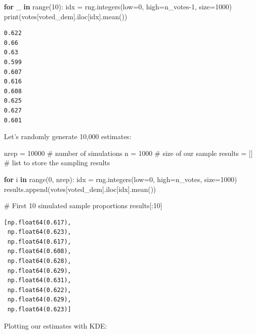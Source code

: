 \documentclass[
  letterpaper,
  DIV=11,
  numbers=noendperiod]{scrreprt}
\newenvironment{Shaded}{\begin{snugshade}}{\end{snugshade}}
\newcommand{\BuiltInTok}[1]{\textcolor[rgb]{0.00,0.23,0.31}{#1}}
\newcommand{\CommentTok}[1]{\textcolor[rgb]{0.37,0.37,0.37}{#1}}
\newcommand{\ControlFlowTok}[1]{\textcolor[rgb]{0.00,0.23,0.31}{\textbf{#1}}}
\newcommand{\DecValTok}[1]{\textcolor[rgb]{0.68,0.00,0.00}{#1}}
\newcommand{\KeywordTok}[1]{\textcolor[rgb]{0.00,0.23,0.31}{\textbf{#1}}}
\newcommand{\NormalTok}[1]{\textcolor[rgb]{0.00,0.23,0.31}{#1}}
\newcommand{\OperatorTok}[1]{\textcolor[rgb]{0.37,0.37,0.37}{#1}}
\newcommand{\StringTok}[1]{\textcolor[rgb]{0.13,0.47,0.30}{#1}}
\begin{document}
\begin{Shaded}
\begin{Highlighting}[]
\ControlFlowTok{for}\NormalTok{ \_ }\KeywordTok{in} \BuiltInTok{range}\NormalTok{(}\DecValTok{10}\NormalTok{):}
\NormalTok{  idx }\OperatorTok{=}\NormalTok{ rng.integers(low}\OperatorTok{=}\DecValTok{0}\NormalTok{, high}\OperatorTok{=}\NormalTok{n\_votes}\OperatorTok{{-}}\DecValTok{1}\NormalTok{, size}\OperatorTok{=}\DecValTok{1000}\NormalTok{)}
  \BuiltInTok{print}\NormalTok{(votes[}\StringTok{\textquotesingle{}voted\_dem\textquotesingle{}}\NormalTok{].iloc[idx].mean())}
\end{Highlighting}
\end{Shaded}

\begin{verbatim}
0.622
0.66
0.63
0.599
0.607
0.616
0.608
0.625
0.627
0.601
\end{verbatim}

Let's randomly generate 10,000 estimates:

\begin{Shaded}
\begin{Highlighting}[]
\NormalTok{nrep }\OperatorTok{=} \DecValTok{10000}   \CommentTok{\# number of simulations}
\NormalTok{n }\OperatorTok{=} \DecValTok{1000}       \CommentTok{\# size of our sample}
\NormalTok{results }\OperatorTok{=}\NormalTok{ []   }\CommentTok{\# list to store the sampling results}

\ControlFlowTok{for}\NormalTok{ i }\KeywordTok{in} \BuiltInTok{range}\NormalTok{(}\DecValTok{0}\NormalTok{, nrep):}
\NormalTok{    idx }\OperatorTok{=}\NormalTok{ rng.integers(low}\OperatorTok{=}\DecValTok{0}\NormalTok{, high}\OperatorTok{=}\NormalTok{n\_votes, size}\OperatorTok{=}\DecValTok{1000}\NormalTok{)}
\NormalTok{    results.append(votes[}\StringTok{\textquotesingle{}voted\_dem\textquotesingle{}}\NormalTok{].iloc[idx].mean())}

\CommentTok{\# First 10 simulated sample proportions}
\NormalTok{results[:}\DecValTok{10}\NormalTok{]}
\end{Highlighting}
\end{Shaded}

\begin{verbatim}
[np.float64(0.617),
 np.float64(0.623),
 np.float64(0.617),
 np.float64(0.608),
 np.float64(0.628),
 np.float64(0.629),
 np.float64(0.631),
 np.float64(0.622),
 np.float64(0.629),
 np.float64(0.623)]
\end{verbatim}

Plotting our estimates with KDE:
\end{document}
